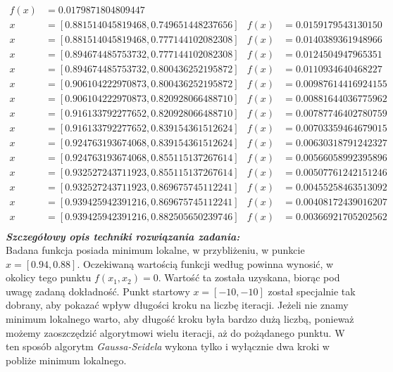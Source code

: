 \documentclass[a4paper,12pt]{article}
\begin{document}
\begin{align*}
f(x) &= 0.0179871804809447 \\
x &= [0.881514045819468, 0.749651448237656] & 
f(x) &= 0.0159179543130150 \\
x &= [0.881514045819468, 0.777144102082308] & 
f(x) &= 0.0140389361948966 \\
x &= [0.894674485753732, 0.777144102082308] & 
f(x) &= 0.0124504947965351 \\
x &= [0.894674485753732, 0.800436252195872] & 
f(x) &= 0.0110934640468227 \\
x &= [0.906104222970873, 0.800436252195872] & 
f(x) &= 0.00987614416924155 \\
x &= [0.906104222970873, 0.820928066488710] & 
f(x) &= 0.00881644036775962 \\
x &= [0.916133792277652, 0.820928066488710] & 
f(x) &= 0.00787746402780759 \\
x &= [0.916133792277652, 0.839154361512624] & 
f(x) &= 0.00703359464679015 \\
x &= [0.924763193674068, 0.839154361512624] & 
f(x) &= 0.00630318791242327 \\
x &= [0.924763193674068, 0.855115137267614] & 
f(x) &= 0.00566058992395896 \\
x &= [0.932527243711923, 0.855115137267614] & 
f(x) &= 0.00507761242151246 \\
x &= [0.932527243711923, 0.869675745112241] & 
f(x) &= 0.00455258463513092 \\
x &= [0.939425942391216, 0.869675745112241] & 
f(x) &= 0.00408172439016207 \\
x &= [0.939425942391216, 0.882505650239746] & 
f(x) &= 0.00366921705202562 \\
\end{align*}
\newpage
\textbf{\textit{Szczegółowy opis techniki rozwiązania zadania:}} \\
Badana funkcja posiada minimum lokalne, w przybliżeniu, w punkcie $x = [0.94, 0.88]$. Oczekiwaną wartością funkcji według \cite{bibitem2} powinna wynosić, w okolicy tego punktu $f(x_{1}, x_{2}) = 0$. Wartość ta została uzyskana, biorąc pod uwagę zadaną dokładność. Punkt startowy $x = [-10, -10]$ został specjalnie tak dobrany, aby pokazać wpływ długości kroku na liczbę iteracji. Jeżeli nie znamy minimum lokalnego warto, aby długość kroku była bardzo dużą liczbą, ponieważ możemy zaoszczędzić algorytmowi wielu iteracji, aż do pożądanego punktu. W ten sposób algorytm \textit{Gaussa-Seidela} wykona tylko i wyłącznie dwa kroki w pobliże minimum lokalnego.
\end{document}
